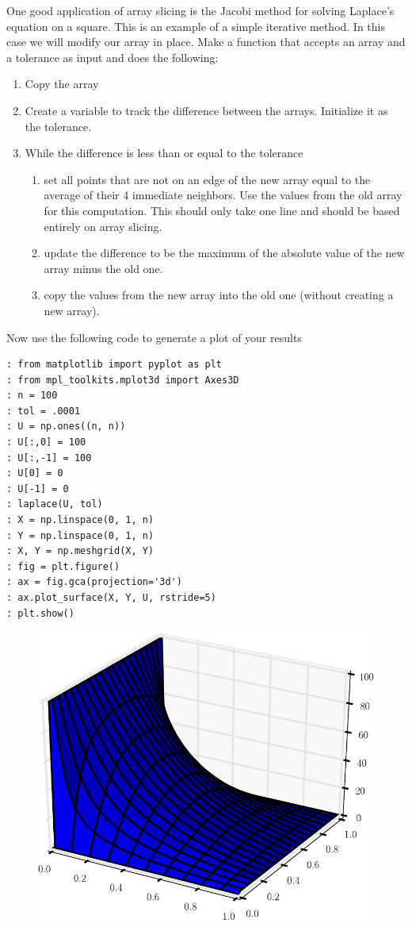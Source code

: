 \begin{problem}
One good application of array slicing is the Jacobi method for solving Laplace's equation on a square.
This is an example of a simple iterative method.
In this case we will modify our array in place.
Make a function that accepts an array and a tolerance as input and does the following:
\begin{enumerate}
\item Copy the array
\item Create a variable to track the difference between the arrays.
Initialize it as the tolerance.
\item While the difference is less than or equal to the tolerance
\begin{enumerate}
	\item set all points that are not on an edge of the new array equal to the average of their 4 immediate neighbors.
Use the values from the old array for this computation.
This should only take one line and should be based entirely on array slicing.
	\item update the difference to be the maximum of the absolute value of the new array minus the old one.
	\item copy the values from the new array into the old one (without creating a new array).
\end{enumerate}
\end{enumerate}

Now use the following code to generate a plot of your results
\begin{lstlisting}
: from matplotlib import pyplot as plt
: from mpl_toolkits.mplot3d import Axes3D
: n = 100
: tol = .0001
: U = np.ones((n, n))
: U[:,0] = 100
: U[:,-1] = 100
: U[0] = 0
: U[-1] = 0
: laplace(U, tol)
: X = np.linspace(0, 1, n)
: Y = np.linspace(0, 1, n)
: X, Y = np.meshgrid(X, Y)
: fig = plt.figure()
: ax = fig.gca(projection='3d')
: ax.plot_surface(X, Y, U, rstride=5)
: plt.show()
\end{lstlisting}

\begin{figure}[H]
\centering
\includegraphics[width=.75\textwidth]{laplace.pdf}
\end{figure}
\end{problem}

